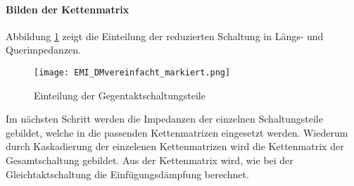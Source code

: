 \paragraph{Bilden der Kettenmatrix}\label{para:kettenGegentakt}
Abbildung \ref{fig:dmschaltungEingeteilt} zeigt die Einteilung der reduzierten Schaltung in Längs- und Querimpedanzen.
 
\begin{figure}[H]
		\centering
		\texttt{[image: EMI\_DMvereinfacht\_markiert.png]}
		\label{fig:dmschaltungEingeteilt}
		\caption{Einteilung der Gegentaktschaltungsteile}
\end{figure}

Im nächsten Schritt werden die Impedanzen der einzelnen Schaltungsteile gebildet, welche in die passenden Kettenmatrizen eingesetzt werden.
Wiederum durch Kaskadierung der einzelenen Kettenmatrizen wird die Kettenmatrix der Gesamtschaltung gebildet. Aus der Kettenmatrix wird, wie bei der Gleichtaktschaltung die Einfügungsdämpfung berechnet.



